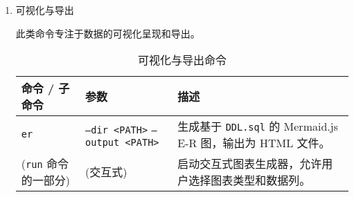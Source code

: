\begin{CJK*}{UTF8}{song}
\begin{enumerate}
    \item 可视化与导出
    
    此类命令专注于数据的可视化呈现和导出。
    \begin{table}[H]
    \centering
    \caption{可视化与导出命令}
    \vspace{2mm}
    \small
    \begin{tabular}{p{2cm}p{2cm}p{3cm}}
    \toprule
    \textbf{命令 / 子命令} & \textbf{参数} & \textbf{描述} \\
    \hline
    \texttt{er} & \texttt{--dir <PATH>} \newline \texttt{--output <PATH>} & 生成基于 \texttt{DDL.sql} 的 Mermaid.js E-R 图，输出为 HTML 文件。 \\
    (\texttt{run} 命令的一部分) & (交互式) & 启动交互式图表生成器，允许用户选择图表类型和数据列。 \\
    \bottomrule
    \end{tabular}
    \label{tab3}
    \end{table}

\end{enumerate}
\end{CJK*}
